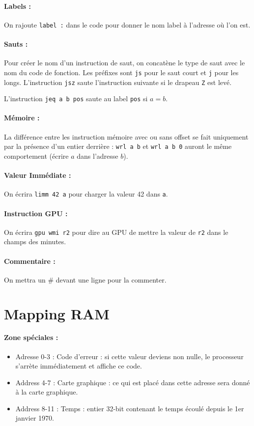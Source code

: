\documentclass[12pt]{article}
\begin{document}
\paragraph{Labels :} On rajoute \verb!label :! dans le code pour donner le nom \og
label \fg{}  à l'adresse où l'on est.

\paragraph{Sauts :} Pour créer le nom d'un instruction de saut, on concatène le
type de saut avec le nom du code de fonction. Les préfixes sont \verb!js! pour
le saut court et \verb!j! pour les longs. L'instruction \verb!jsz! saute
l'instruction suivante si le drapeau \verb!Z! est levé.

L'instruction \verb!jeq a b pos! saute au label \verb!pos! si $a = b$.

\paragraph{Mémoire :} La différence entre les instruction mémoire avec ou sans
offset se fait uniquement par la présence d'un entier derrière : \verb!wrl a b! et
\verb!wrl a b 0! auront le même comportement (écrire $a$ dans l'adresse $b$).

\paragraph{Valeur Immédiate :} On écrira \verb!limm 42 a! pour charger la valeur
42 dans \verb!a!.

\paragraph{Instruction GPU :} On écrira \verb!gpu wmi r2! pour dire au GPU de
mettre la valeur de \verb!r2! dans le champs des minutes.

\paragraph{Commentaire :} On mettra un \# devant une ligne pour la commenter.

\section{Mapping RAM}

\paragraph{Zone spéciales :}
\begin{itemize}
\item Adresse 0-3 : Code d'erreur : si cette valeur deviens non nulle, le
  processeur s'arrète immédiatement et affiche ce code.
\item Address 4-7 : Carte graphique : ce qui est placé dans cette adresse sera
  donné à la carte graphique.
\item Address 8-11 : Temps : entier 32-bit contenant le temps écoulé depuis le
  1er janvier 1970.
\end{itemize}
\end{document}
